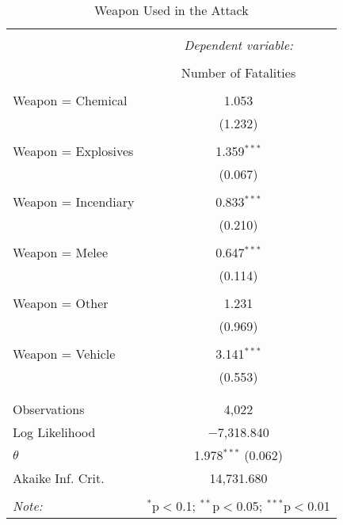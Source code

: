
\begin{table}[!htbp] \centering 
  \caption{Weapon Used in the Attack} 
  \label{} 
\begin{tabular}{@{\extracolsep{5pt}}lc} 
\\[-1.8ex]\hline 
\hline \\[-1.8ex] 
 & \multicolumn{1}{c}{\textit{Dependent variable:}} \\ 
\cline{2-2} 
\\[-1.8ex] & Number of Fatalities \\ 
\hline \\[-1.8ex] 
 Weapon = Chemical & 1.053 \\ 
  & (1.232) \\ 
  & \\ 
 Weapon = Explosives & 1.359$^{***}$ \\ 
  & (0.067) \\ 
  & \\ 
 Weapon = Incendiary & 0.833$^{***}$ \\ 
  & (0.210) \\ 
  & \\ 
 Weapon = Melee & 0.647$^{***}$ \\ 
  & (0.114) \\ 
  & \\ 
 Weapon = Other & 1.231 \\ 
  & (0.969) \\ 
  & \\ 
 Weapon = Vehicle & 3.141$^{***}$ \\ 
  & (0.553) \\ 
  & \\ 
\hline \\[-1.8ex] 
Observations & 4,022 \\ 
Log Likelihood & $-$7,318.840 \\ 
$\theta$ & 1.978$^{***}$  (0.062) \\ 
Akaike Inf. Crit. & 14,731.680 \\ 
\hline 
\hline \\[-1.8ex] 
\textit{Note:}  & \multicolumn{1}{r}{$^{*}$p$<$0.1; $^{**}$p$<$0.05; $^{***}$p$<$0.01} \\ 
\end{tabular} 
\end{table} 
